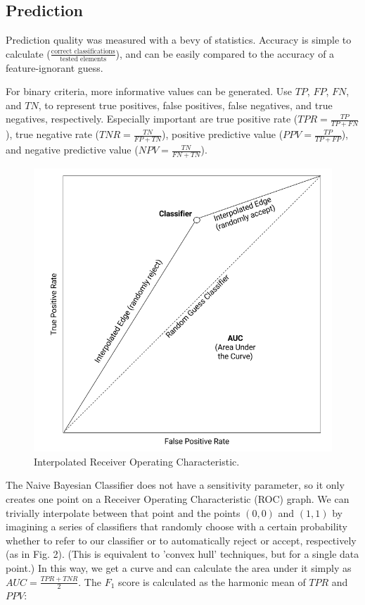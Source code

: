 \documentclass[format=acmlarge]{acmart}
\begin{document}
\subsection{Prediction}
Prediction quality was measured with a bevy of statistics.  Accuracy is simple to calculate ($\frac{\textrm{correct classifications}}{\textrm{tested elements}}$), and can be easily compared to the accuracy of a feature-ignorant guess.

For binary criteria, more informative values can be generated.  Use $\mathit{TP}$, $\mathit{FP}$, $\mathit{FN}$, and $\mathit{TN}$, to represent true positives, false positives, false negatives, and true negatives, respectively.  Especially important are true positive rate ($\mathit{TPR} = \frac{\mathit{TP}}{\mathit{TP} + \mathit{FN}}$), true negative rate ($\mathit{TNR} = \frac{\mathit{TN}}{\mathit{FP} + \mathit{TN}}$), positive predictive value ($\mathit{PPV} = \frac{\mathit{TP}}{\mathit{TP} + \mathit{FP}}$), and negative predictive value ($\mathit{NPV} = \frac{\mathit{TN}}{\mathit{FN} + \mathit{TN}}$).

\begin{figure}
  \includegraphics{interpolated-roc}
  \caption{Interpolated Receiver Operating Characteristic.}
  \label{fig:two}
\end{figure}

The Naive Bayesian Classifier does not have a sensitivity parameter, so it only creates one point on a Receiver Operating Characteristic (ROC) graph.  We can trivially interpolate between that point and the points $(0, 0)$ and $(1, 1)$ by imagining a series of classifiers that randomly choose with a certain probability whether to refer to our classifier or to automatically reject or accept, respectively (as in Fig. 2).  (This is equivalent to 'convex hull' techniques, but for a single data point.)  In this way, we get a curve and can calculate the area under it simply as $\mathit{AUC} = \frac{\mathit{TPR} + \mathit{TNR}}{2}$.  The $F_1$ score is calculated as the harmonic mean of $\mathit{TPR}$ and $\mathit{PPV}$:
\end{document}
